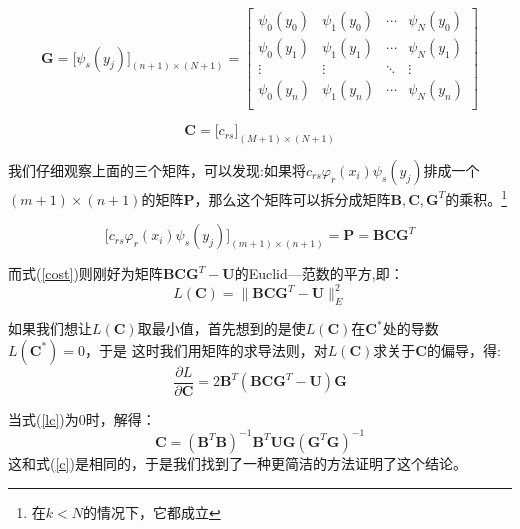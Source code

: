 \[\bm{G} =\big[\psi_{s}(y_j)\big]_{(n+1)\times (N+1)}=
\begin{bmatrix}
{\psi_{0}(y_0)}&{\psi_{1}(y_0)}& \cdots &{\psi_{N}(y_0)}\\
{\psi_{0}(y_1)}&{\psi_{1}(y_1)}& \cdots &{\psi_{N}(y_1)}\\
 \vdots & \vdots & \ddots & \vdots \\
{\psi_{0}(y_n)}&{\psi_{1}(y_n)}& \cdots &{\psi_{N}(y_n)}\\
\end{bmatrix}\]

\[\bm{C} =\big[c_{rs}\big]_{(M+1)\times (N+1)}\]

我们仔细观察上面的三个矩阵，可以发现:如果将$c_{rs}\varphi_{r}(x_i)\psi_{s}(y_j)$排成一个$(m+1)\times (n+1)$的矩阵$\bm{P}$，那么这个矩阵可以拆分成矩阵$\bm{B},\bm{C},\bm{G}^T$的乘积。\footnote{在$k<N$的情况下，它都成立}


\begin{equation}
\Big[c_{rs}\varphi_{r}(x_i)\psi_{s}(y_j) \Big]_{(m+1)\times (n+1)}=\bm{P}=\bm{B}\bm{C}\bm{G}^T
\end{equation}


而式(\ref{cost})则刚好为矩阵$\bm{B}\bm{C}\bm{G}^T-\bm{U}$的Euclid---范数的平方,即：
\begin{equation}
L(\bm{C})={\|{\bm{B}\bm{C}\bm{G}^T-\bm{U}}\|_{E}^2}
\end{equation}

如果我们想让$L(\bm{C})$取最小值，首先想到的是使$L(\bm{C})$在$\bm{C}^{\ast}$处的导数$L(\bm{C}^{\ast})=0$，于是
这时我们用矩阵的求导法则，对$L(\bm{C})$求关于$\bm{C}$的偏导，得:
\begin{equation}
\label{lc}
\dfrac{\partial L}{\partial \bm{C}}=2\bm{B}^T(\bm{B}\bm{C}\bm{G}^T-\bm{U})\bm{G}
\end{equation}

当式(\ref{lc})为0时，解得：
\begin{equation}
\bm{C}=(\bm{B}^T\bm{B})^{-1}\bm{B}^T\bm{U}\bm{G}(\bm{G}^T\bm{G})^{-1}
\end{equation}
这和式(\ref{c})是相同的，于是我们找到了一种更简洁的方法证明了这个结论。


